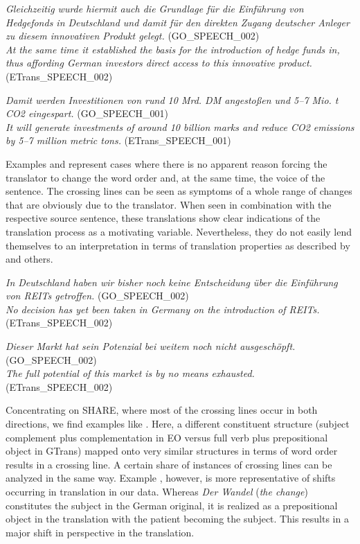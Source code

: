 \documentclass[output=paper]{LSP/langsci}
\begin{document}
\ea \label{ex:culo:29}
     \ea \textit{Gleichzeitig wurde hiermit auch die Grundlage für die Einführung von Hedgefonds in Deutschland und damit für den direkten Zugang deutscher Anleger zu diesem innovativen Produkt gelegt.} (GO\_SPEECH\_002)\\
      \ex \textit{At the same time it established the basis for the introduction of hedge funds in, thus affording German investors direct access to this innovative product.} (ETrans\_SPEECH\_002)
      \z
\z


\ea \label{ex:culo:30}
   \ea \textit{Damit werden Investitionen von rund 10 Mrd. DM angestoßen und 5--7 Mio. t CO2 eingespart.} (GO\_SPEECH\_001)\\
      \ex \textit{It will generate investments of around 10 billion marks and reduce CO2 emissions by 5--7 million metric tons.} (ETrans\_SPEECH\_001) 
      \z
\z

Examples  and  represent cases where there is no apparent reason forcing the translator to change the word order and, at the same time, the voice of the sentence. The crossing lines can be seen as symptoms of a whole range of changes that are obviously due to the translator. When seen in combination with the respective source sentence, these translations show clear indications of the translation process as a motivating variable. Nevertheless, they do not easily lend themselves to an interpretation in terms of translation properties as described by \citet{Baker1996} and others. 

\ea \label{ex:culo:31}
    \ea \textit{In Deutschland haben wir bisher noch keine Entscheidung über die Einführung von REITs getroffen. }(GO\_SPEECH\_002)\\
    \ex \textit{No decision has yet been taken in Germany on the introduction of REITs.} (ETrans\_SPEECH\_002) 
    \z
\z


\ea \label{ex:culo:32}
    \ea \textit{Dieser Markt hat sein Potenzial bei weitem noch nicht ausgeschöpft.} (GO\_SPEECH\_002)\\
     \ex \textit{The full potential of this market is by no means exhausted.} (ETrans\_SPEECH\_002)
     \z
\z

Concentrating on SHARE, where most of the crossing lines occur in both directions, we find examples like . Here, a different constituent structure (subject complement plus complementation in EO versus full verb plus prepositional object in GTrans) mapped onto very similar structures in terms of word order results in a crossing line. A certain share of instances of crossing lines can be analyzed in the same way. Example , however, is more representative of shifts occurring in translation in our data. Whereas \textit{Der Wandel} (\textit{the change}) constitutes the subject in the German original, it is realized as a prepositional object in the translation with the patient becoming the subject. This results in a major shift in perspective in the translation. 
\end{document}
